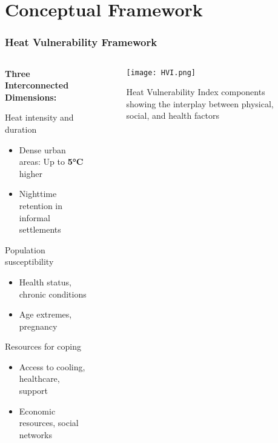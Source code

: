 \documentclass[aspectratio=169]{beamer}
\newcommand{\concept}[1]{\textcolor{witsteal}{\textbf{#1}}}
\newcommand{\statistic}[1]{\textcolor{witsaccent}{\textbf{#1}}}
\newcommand{\insighttitle}[1]{\textcolor{witsdark}{\textbf{\Large #1}}}
\begin{document}
\section{Conceptual Framework}

\begin{frame}
    \frametitle{Heat Vulnerability Framework}
    
    \begin{columns}[T]
        \begin{column}{0.55\textwidth}
            \insighttitle{Three Interconnected Dimensions:}
            \vspace{0.3cm}
            
            \begin{description}[leftmargin=!, labelwidth=\widthof{\bfseries Adaptive Capacity}]
                \item[\concept{Exposure}] Heat intensity and duration
                \begin{itemize}[itemsep=4pt]
                    \item Dense urban areas: Up to \statistic{5°C} higher
                    \item Nighttime retention in informal settlements
                \end{itemize}
                \item[\concept{Sensitivity}] Population susceptibility
                \begin{itemize}[itemsep=4pt]
                    \item Health status, chronic conditions
                    \item Age extremes, pregnancy
                \end{itemize}
                \item[\concept{Adaptive Capacity}] Resources for coping
                \begin{itemize}[itemsep=4pt]
                    \item Access to cooling, healthcare, support
                    \item Economic resources, social networks
                \end{itemize}
            \end{description}
        \end{column}
        \begin{column}{0.4\textwidth}
            \begin{figure}
                \texttt{[image: HVI.png]}
                \caption{\small Heat Vulnerability Index components showing the interplay between physical, social, and health factors}
            \end{figure}
        \end{column}
    \end{columns}
    

\end{frame}
\end{document}
